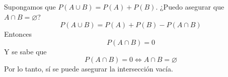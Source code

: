 \item Supongamos que $P(A\cup B)=P(A)+P(B)$. ¿Puedo asegurar que $A\cap B=\varnothing$?
    \[P(A\cup B)=P(A)+P(B)-P(A\cap B)\]
    Entonces \[P(A\cap B)=0\]
    Y se sabe que \[P(A\cap B)=0 \Leftrightarrow A\cap B=\varnothing\]
    Por lo tanto, sí se puede asegurar la intersección vacía.